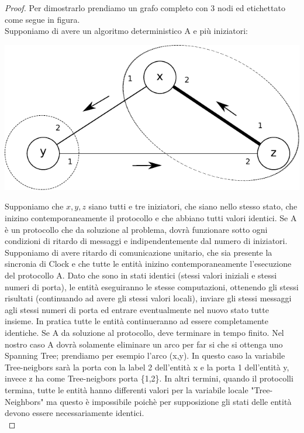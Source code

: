 \begin{proof}
    Per dimostrarlo prendiamo un grafo completo con 3 nodi ed etichettato come
    segue in figura.\\
    Supponiamo di avere un algoritmo deterministico A e più iniziatori:
    \begin{center}
        \includegraphics[scale=0.8]{images/n_37}
    \end{center}

    Supponiamo che $x, y, z$ siano tutti e tre iniziatori, che siano nello
    stesso stato, che inizino contemporaneamente il protocollo e che abbiano
    tutti valori identici. Se A è un protocollo che da soluzione al problema,
    dovrà funzionare sotto ogni condizioni di ritardo di messaggi e
    indipendentemente dal numero di iniziatori. Supponiamo di avere ritardo di
    comunicazione unitario, che sia presente la sincronia di Clock e che tutte
    le entità inizino contemporaneamente l'esecuzione del protocollo A. Dato che
    sono in stati identici (stessi valori iniziali e stessi numeri di porta), le
    entità eseguiranno le stesse computazioni, ottenendo gli stessi risultati
    (continuando ad avere gli stessi valori locali), inviare gli stessi messaggi
    agli stessi numeri di porta ed entrare eventualmente nel nuovo stato tutte
    insieme. In pratica tutte le entità continueranno ad essere completamente
    identiche. Se A da soluzione al protocollo, deve terminare in tempo finito.
    Nel nostro caso A dovrà solamente eliminare un arco per far si che si
    ottenga uno Spanning Tree; prendiamo per esempio l'arco (x,y). In questo
    caso la variabile Tree-neigbors sarà la porta con la label 2 dell'entità x e
    la porta 1 dell'entità y, invece z ha come Tree-neigbors porta \{1,2\}. In
    altri termini, quando il protocolli termina, tutte le entità hanno
    differenti valori per la variabile locale "Tree-Neighbors" ma questo è
    impossibile poichè per supposizione gli stati delle entità devono essere
    necessariamente identici.\\


\end{proof}

